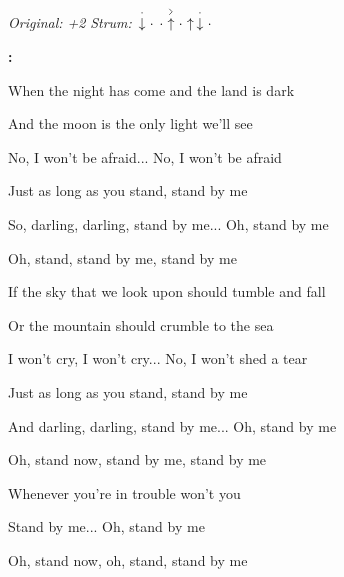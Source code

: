\begin{song}


\begin{headerbox}
\RaiseBoxWithAccents
\textit{Original: +2} \quad
\textit{Strum:} $\StaccatoDown\Miss\Miss\AccentUp\Miss\Up\StaccatoDown\Miss$
\end{headerbox}

\begin{hchordbox}
\end{hchordbox}

\Large

\bigskip

\Intro\textbf{:}      \par

\bigskip

When the night has come  and the land is dark \par
And the moon is the only light we'll see \par
No, I won't be afraid... No, I won't be afraid \par
Just as long as you stand, stand by me \par

\bigskip

So, darling, darling, stand by me... Oh, stand by me \par
Oh, stand,  stand by me,  stand by me \par


\bigskip

If the sky that we look upon  should tumble and fall \par
Or the mountain should crumble to the sea \par
I won't cry, I won't cry... No, I won't shed a tear \par
Just as long as you stand, stand by me \par

\bigskip

And darling, darling, stand by me... Oh, stand by me \par
Oh, stand now,  stand by me,  stand by me \par
Whenever you're in trouble won't you \par
{}Stand by me... Oh, stand by me \par
Oh, stand now, oh, stand, stand by me \par

\end{song}